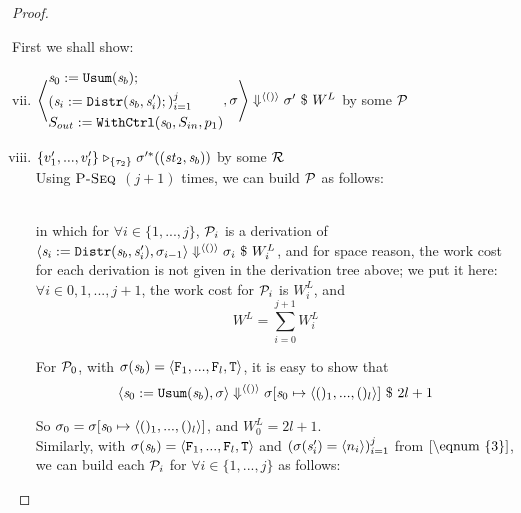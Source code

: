 \begin{proof}
\begin{itemize}
First we shall show: 
	\begin{enumerate}[(i)]
	\setcounter{enumi}{6}
	\item \label{comp-5} $\left\langle\begin{aligned} &\mathit{s}_0 := \mathtt{Usum}(\mathit{s}_b); \\ &(\mathit{s}_i := \mathtt{Distr}(\mathit{s}_b,\mathit{s}_i');)^j_{i=1} \\ &S_{out} := \mathtt{WithCtrl}(\mathit{s}_0,S_{in},p_1) \end{aligned},\sigma \right\rangle \Downarrow^{\langle () \rangle} \sigma' \ \$ \ W^L$
	by some $\mathcal{P}$
	\item $\{ v'_1,...,v'_l \} \mathrel{\triangleright_{\{\tau_2\}}} \sigma'^*((\mathit{st}_2,\mathit{s}_b))$ by some $\mathcal{R}$ \\

Using $\textsc{P-Seq}$ $(j+1)$ times, we can build $\mathcal{P}$ as follows:

{\normalsize
{}}\\

 in which for $\forall i \in \{1,...,j\}$, $\mathcal{P}_i$ is a derivation of  $\left\langle\mathit{s}_i := \mathtt{Distr}(\mathit{s}_b,\mathit{s}_i'),\sigma_{i-1} \right\rangle \Downarrow^{\langle () \rangle} \sigma_{i} \ \$ \ W^L_i$,
 and for space reason, the work cost for each derivation is not given in the derivation tree above; we put it here: $\forall i \in {0,1,...,j+1}$, the work cost for $\mathcal{P}_i$ is $W^L_i$,
 and $$W^L = \sum_{i=0}^{j+1} W^L_i$$
 

 
  For $\mathcal{P}_0$, with $\sgm(\s_b) = \stwo$, it is easy to show that
  $$\seval{\usumdef}{\sgm}{\vunit}{\sgm[\s_0 \|-> \lunit]}{2l+1}$$
  

    So $\sgm_0 = \sgm[\s_0 \|-> \lunit]$, and $W^L_0 = 2l+1$.\\

	Similarly, with  $\sgm(\s_b) = \stwo$ and $(\sigma(\mathit{s}_i') = \langle n_i \rangle)^j_{i=1}$ from $\eqref{\eqnum{3}}$, we can build each $\mathcal{P}_i$ for 
	$\forall i \in \{1,...,j\}$ as follows:\\
	
  

\end{enumerate}
\end{itemize}
\end{proof}
